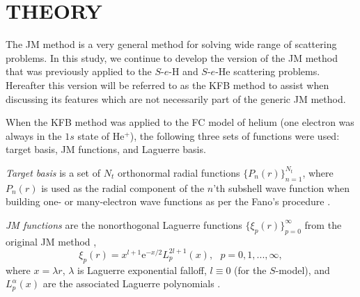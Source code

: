 \documentclass[aip
, pra
, showpacs
, aps
, twocolumn
, groupedaddress
, floatfix
]{revtex4}
\newcommand{\beq}{\begin{equation}}
\newcommand{\eeq}{\end{equation}}
\begin{document}
\begin{table}[htb]
\begin{ruledtabular}
\begin{tabular}{rlll}




\end{tabular}
\end{ruledtabular}
\end{table}



\section{THEORY}

The JM method \cite{HY74p1201,BR76p1491} is a very general method for solving wide range of scattering problems.
In this study, we continue to develop the version of the JM method that
was previously applied to the $S$-$e$-H \cite{KB10p022708}  and $S$-$e$-He \cite{KFB11} scattering problems.
Hereafter this version will be referred to as the KFB method to assist when discussing its features which are not necessarily part of the generic JM method.

When the KFB method was applied to the FC model of helium \cite{KFB11} (one electron was always in the $1s$ state of He$^+$),
the following three sets of functions were used: target basis, JM functions, and Laguerre basis.

{\em Target basis} is a set of $N_t$ orthonormal radial functions $\{P_n(r)\}_{n=1}^{N_t}$,
where $P_n(r)$ is used as the radial component of the $n$'th subshell wave function
when building one- or many-electron wave functions as per the Fano's procedure \cite{Fano65, KFB11}.

{\em JM functions} are the nonorthogonal Laguerre functions $\{\xi_p(r)\}_{p=0}^\infty$ from the original JM method \cite{HY74p1201,BR76p1491},
\beq
\xi_p(r) = x^{l+1} \mbox{e}^{-x /2}
L_p^{2l+1}(x), \ \ \ p = 0, 1, ..., \infty,
\eeq
where $x=\lambda r$, $\lambda$ is Laguerre exponential falloff,
$l \equiv 0$ (for the $S$-model), and $L_p^{\alpha}(x)$ are the associated Laguerre polynomials \cite{abramowitz}.
\end{document}
